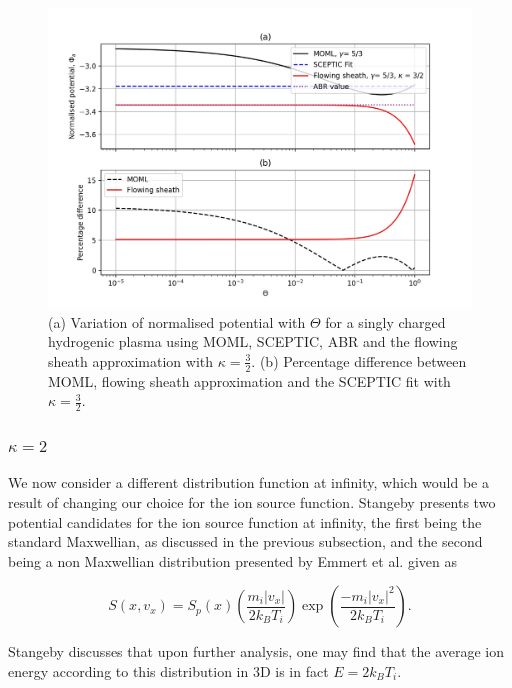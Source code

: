 \documentclass{article}
\begin{document}
\begin{figure}[H]
\centering
\includegraphics[width=\linewidth]{Output/MOMLvsFS_kappa1_5.jpeg}
\caption{(a) Variation of normalised potential with $\Theta$ for a singly charged hydrogenic plasma using MOML, SCEPTIC,
ABR and the flowing sheath approximation with $\kappa = \frac{3}{2}$. (b) Percentage difference between MOML, flowing 
sheath approximation and the SCEPTIC fit with $\kappa = \frac{3}{2}$.}
\label{MOMLvsFS_kappa_1_5} 
\end{figure}

\subsubsection{$\kappa = 2$}

We now consider a different distribution function at infinity, which would be a result of changing our choice for the ion
source function. Stangeby presents two potential candidates for the ion source function at infinity, the first being 
the standard Maxwellian, as discussed in the previous subsection, and the second being a non Maxwellian distribution presented by Emmert et al. \cite{kappa2} given 
as

\begin{equation}\label{eq:DistFunc}
S(x,v_x) = S_p(x) \left(\frac{m_i |v_x|}{2k_B T_i}\right) \exp{\left(\frac{- m_i |v_x|^2}{2k_B T_i}\right)}.
\end{equation}

\smallskip

Stangeby discusses that upon further analysis, one may find that the average ion energy according to this 
distribution in 3D is in fact $E = 2k_B T_i$.
\end{document}
